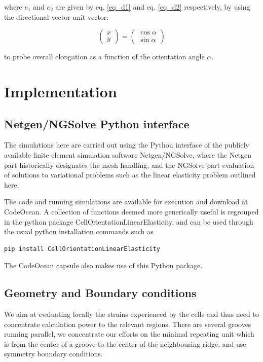 \documentclass[11pt]{amsart}
\begin{document}
where $e_1$ and $e_2$ are given by eq. \ref{eq_d1} and eq. \ref{eq_d2} respectively, by using the directional vector unit vector:

\begin{equation}
\left( \begin{matrix}x \\ y \end{matrix} \right)=\left( \begin{matrix}\cos \alpha  \\ \sin \alpha \end{matrix} \right)
\end{equation}

to probe overall elongation as a function of the orientation angle $\alpha$.

\section{Implementation}

\subsection{Netgen/NGSolve Python interface}

The simulations here are carried out using the Python interface of the publicly available finite element simulation software Netgen/NGSolve, where the Netgen part historically designates the mesh handling, and the NGSolve part evaluation of solutions to variational problems such as the linear elasticity problem outlined here.

The  code and running simulations are available for execution and download at CodeOcean. A collection of functions deemed more generically useful is regrouped in the python package CellOrientationLinearElasticity, and can be used through the usual python installation commands such as 

\begin{verbatim}pip install CellOrientationLinearElasticity\end{verbatim}

The CodeOcean capsule also makes use of this Python package. 

 \subsection{Geometry and Boundary conditions}
 
We aim at evaluating locally the strains experienced by the cells and thus need to concentrate calculation power to the relevant regions. There are several grooves running parallel, we concentrate our efforts on the minimal repeating unit which is from the center of a groove to the center of the neighbouring ridge, and use symmetry boundary conditions.
\end{document}
